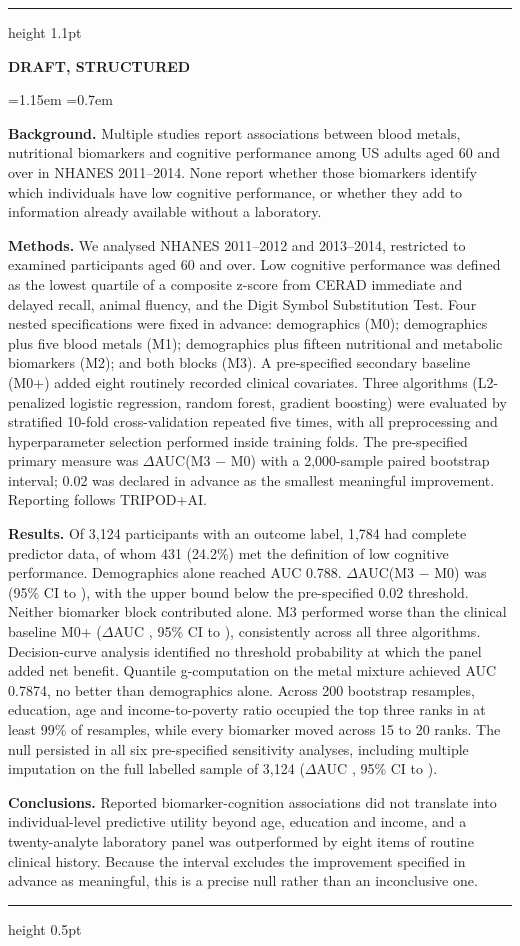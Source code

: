 \documentclass[11pt]{article}
\newcommand{\lbl}[1]{{\sffamily\footnotesize\bfseries\color{muted}\MakeUppercase{#1}}}
\newcommand{\num}[1]{{\ttfamily #1}}
\newenvironment{callout}[1]{%
  \par\medskip
  {\color{accent}\hrule height 1.1pt}
  \vspace{7pt}
  \lbl{#1}\par\vspace{2pt}
  \begingroup\leftskip=1.15em \rightskip=0.7em
}{%
  \par\endgroup
  \vspace{7pt}
  {\color{rule}\hrule height 0.5pt}
  \par\medskip
}
\begin{document}
\begin{callout}{Draft, structured}
\textbf{Background.} Multiple studies report associations between blood metals, nutritional biomarkers and cognitive performance among US adults aged 60 and over in NHANES 2011--2014. None report whether those biomarkers identify which individuals have low cognitive performance, or whether they add to information already available without a laboratory.

\textbf{Methods.} We analysed NHANES 2011--2012 and 2013--2014, restricted to examined participants aged 60 and over. Low cognitive performance was defined as the lowest quartile of a composite z-score from CERAD immediate and delayed recall, animal fluency, and the Digit Symbol Substitution Test. Four nested specifications were fixed in advance: demographics (M0); demographics plus five blood metals (M1); demographics plus fifteen nutritional and metabolic biomarkers (M2); and both blocks (M3). A pre-specified secondary baseline (M0+) added eight routinely recorded clinical covariates. Three algorithms (L2-penalized logistic regression, random forest, gradient boosting) were evaluated by stratified 10-fold cross-validation repeated five times, with all preprocessing and hyperparameter selection performed inside training folds. The pre-specified primary measure was $\Delta$AUC(M3 $-$ M0) with a 2,000-sample paired bootstrap interval; 0.02 was declared in advance as the smallest meaningful improvement. Reporting follows TRIPOD+AI.

\textbf{Results.} Of 3,124 participants with an outcome label, 1,784 had complete predictor data, of whom 431 (24.2\%) met the definition of low cognitive performance. Demographics alone reached AUC 0.788. $\Delta$AUC(M3 $-$ M0) was \num{-0.0019} (95\% CI \num{-0.0108} to \num{0.0071}), with the upper bound below the pre-specified 0.02 threshold. Neither biomarker block contributed alone. M3 performed worse than the clinical baseline M0+ ($\Delta$AUC \num{-0.0158}, 95\% CI \num{-0.0295} to \num{-0.0033}), consistently across all three algorithms. Decision-curve analysis identified no threshold probability at which the panel added net benefit. Quantile g-computation on the metal mixture achieved AUC 0.7874, no better than demographics alone. Across 200 bootstrap resamples, education, age and income-to-poverty ratio occupied the top three ranks in at least 99\% of resamples, while every biomarker moved across 15 to 20 ranks. The null persisted in all six pre-specified sensitivity analyses, including multiple imputation on the full labelled sample of 3,124 ($\Delta$AUC \num{0.0015}, 95\% CI \num{-0.0030} to \num{0.0063}).

\textbf{Conclusions.} Reported biomarker-cognition associations did not translate into individual-level predictive utility beyond age, education and income, and a twenty-analyte laboratory panel was outperformed by eight items of routine clinical history. Because the interval excludes the improvement specified in advance as meaningful, this is a precise null rather than an inconclusive one.
\end{callout}
\end{document}
